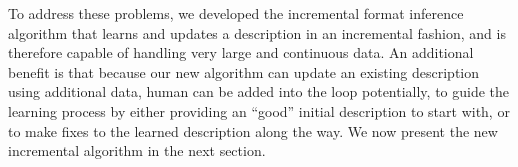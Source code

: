 To address these problems, we developed the incremental format inference
algorithm that learns and updates a description in an incremental fashion, and
is therefore capable of handling very large and continuous data. An additional
benefit is that because our new algorithm can update an existing description
using additional data, human can be added into the loop potentially, to 
guide the learning process by either providing an ``good'' initial description
to start with, or to make fixes to the learned description along the way.
We now present the new incremental algorithm in the next section.

%
%
%
%

